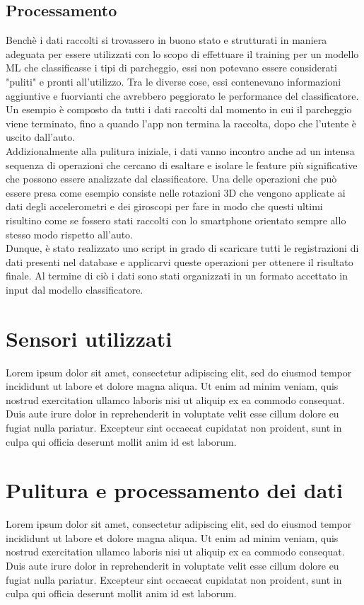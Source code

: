 \subsection{Processamento}

Benchè i dati raccolti si trovassero in buono stato e strutturati in maniera adeguata per 
essere utilizzati con lo scopo di effettuare il training per un modello ML che classificasse
i tipi di parcheggio, essi non potevano essere considerati "puliti" e pronti all'utilizzo.
Tra le diverse cose, essi contenevano informazioni aggiuntive e fuorvianti che avrebbero
peggiorato le performance del classificatore. Un esempio è composto da tutti i dati raccolti
dal momento in cui il parcheggio viene terminato, fino a quando l'app non termina la raccolta,
dopo che l'utente è uscito dall'auto.\\
Addizionalmente alla pulitura iniziale, i dati vanno incontro anche ad un intensa sequenza
di operazioni che cercano di esaltare e isolare le feature più significative che possono
essere analizzate dal classificatore. Una delle operazioni che può essere presa come esempio 
consiste nelle rotazioni 3D che vengono applicate ai dati degli accelerometri e dei giroscopi
per fare in modo che questi ultimi risultino come se fossero stati raccolti con lo smartphone
orientato sempre allo stesso modo rispetto all'auto.\\
Dunque, è stato realizzato uno script in grado di scaricare tutti le registrazioni di dati
presenti nel database e applicarvi queste operazioni per ottenere il risultato finale.
Al termine di ciò i dati sono stati organizzati in un formato accettato in input dal 
modello classificatore.


\section{Sensori utilizzati} Lorem ipsum dolor sit amet, consectetur adipiscing elit, sed do eiusmod tempor incididunt ut labore et dolore magna aliqua. Ut enim ad minim veniam, quis nostrud exercitation ullamco laboris nisi ut aliquip ex ea commodo consequat. Duis aute irure dolor in reprehenderit in voluptate velit esse cillum dolore eu fugiat nulla pariatur. Excepteur sint occaecat cupidatat non proident, sunt in culpa qui officia deserunt mollit anim id est laborum.
\section{Pulitura e processamento dei dati} Lorem ipsum dolor sit amet, consectetur adipiscing elit, sed do eiusmod tempor incididunt ut labore et dolore magna aliqua. Ut enim ad minim veniam, quis nostrud exercitation ullamco laboris nisi ut aliquip ex ea commodo consequat. Duis aute irure dolor in reprehenderit in voluptate velit esse cillum dolore eu fugiat nulla pariatur. Excepteur sint occaecat cupidatat non proident, sunt in culpa qui officia deserunt mollit anim id est laborum.
